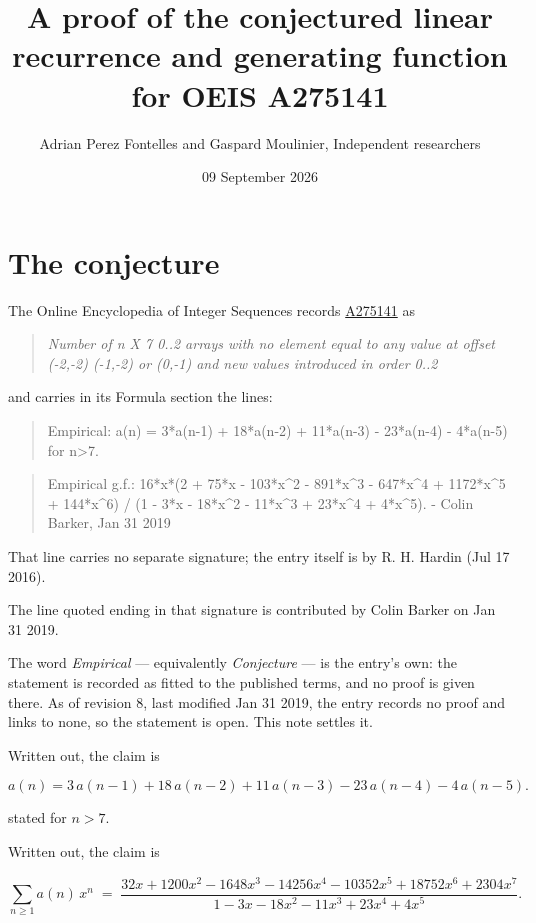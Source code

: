 \documentclass[11pt]{article}
\title{A proof of the conjectured linear recurrence and generating function for OEIS A275141}
\author{Adrian Perez Fontelles and Gaspard Moulinier, Independent researchers}
\date{09 September 2026}
\theoremstyle{definition}
\begin{document}
\maketitle
\section{The conjecture}

The Online Encyclopedia of Integer Sequences records \href{https://oeis.org/A275141}{A275141} as

\begin{quote}\itshape Number of n X 7 0..2 arrays with no element equal to any value at offset (-2,-2) (-1,-2) or (0,-1) and new values introduced in order 0..2\end{quote}

and carries in its Formula section the lines:

\begin{quote}\ttfamily Empirical: a(n) = 3*a(n-1) + 18*a(n-2) + 11*a(n-3) - 23*a(n-4) - 4*a(n-5) for n>7.\end{quote}

\begin{quote}\ttfamily Empirical g.f.: 16*x*(2 + 75*x - 103*x\textasciicircum{}2 - 891*x\textasciicircum{}3 - 647*x\textasciicircum{}4 + 1172*x\textasciicircum{}5 + 144*x\textasciicircum{}6) / (1 - 3*x - 18*x\textasciicircum{}2 - 11*x\textasciicircum{}3 + 23*x\textasciicircum{}4 + 4*x\textasciicircum{}5). - Colin Barker, Jan 31 2019\end{quote}

That line carries no separate signature; the entry itself is by R. H. Hardin (Jul 17 2016).

The line quoted ending in that signature is contributed by Colin Barker on Jan 31 2019.

The word {\itshape Empirical} --- equivalently {\itshape Conjecture} --- is the entry's own: the statement is recorded as fitted to the published terms, and no proof is given there. As of revision 8, last modified Jan 31 2019, the entry records no proof and links to none, so the statement is open. This note settles it.

Written out, the claim is

\[a(n) = 3\,a(n-1) + 18\,a(n-2) + 11\,a(n-3) - 23\,a(n-4) - 4\,a(n-5).\]

stated for $n > 7$.

Written out, the claim is

\[\sum_{n \ge 1} a(n)\,x^n \;=\; \frac{32x + 1200x^{2} - 1648x^{3} - 14256x^{4} - 10352x^{5} + 18752x^{6} + 2304x^{7}}{1 - 3x - 18x^{2} - 11x^{3} + 23x^{4} + 4x^{5}}.\]
\end{document}
